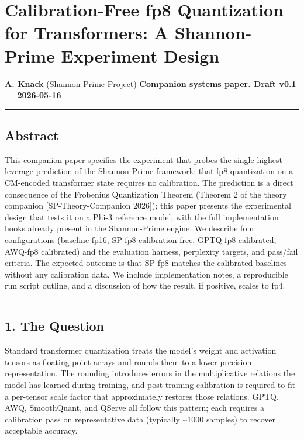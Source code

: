 \documentclass[
  11pt,
]{article}
\author{}
\date{}
\begin{document}
\hypertarget{calibration-free-fp8-quantization-for-transformers-a-shannon-prime-experiment-design}{%
\section{Calibration-Free fp8 Quantization for Transformers: A
Shannon-Prime Experiment
Design}\label{calibration-free-fp8-quantization-for-transformers-a-shannon-prime-experiment-design}}

\textbf{A. Knack} (Shannon-Prime Project) \textbf{Companion systems
paper. Draft v0.1 --- 2026-05-16}

\begin{center}\rule{0.5\linewidth}{0.5pt}\end{center}

\hypertarget{abstract}{%
\subsection{Abstract}\label{abstract}}

This companion paper specifies the experiment that probes the single
highest-leverage prediction of the Shannon-Prime framework: that fp8
quantization on a CM-encoded transformer state requires no calibration.
The prediction is a direct consequence of the Frobenius Quantization
Theorem (Theorem 2 of the theory companion {[}SP-Theory-Companion
2026{]}); this paper presents the experimental design that tests it on a
Phi-3 reference model, with the full implementation hooks already
present in the Shannon-Prime engine. We describe four configurations
(baseline fp16, SP-fp8 calibration-free, GPTQ-fp8 calibrated, AWQ-fp8
calibrated) and the evaluation harness, perplexity targets, and
pass/fail criteria. The expected outcome is that SP-fp8 matches the
calibrated baselines without any calibration data. We include
implementation notes, a reproducible run script outline, and a
discussion of how the result, if positive, scales to fp4.

\begin{center}\rule{0.5\linewidth}{0.5pt}\end{center}

\hypertarget{the-question}{%
\subsection{1. The Question}\label{the-question}}

Standard transformer quantization treats the model's weight and
activation tensors as floating-point arrays and rounds them to a
lower-precision representation. The rounding introduces errors in the
multiplicative relations the model has learned during training, and
post-training calibration is required to fit a per-tensor scale factor
that approximately restores those relations. GPTQ, AWQ, SmoothQuant, and
QServe all follow this pattern; each requires a calibration pass on
representative data (typically \textasciitilde1000 samples) to recover
acceptable accuracy.
\end{document}

